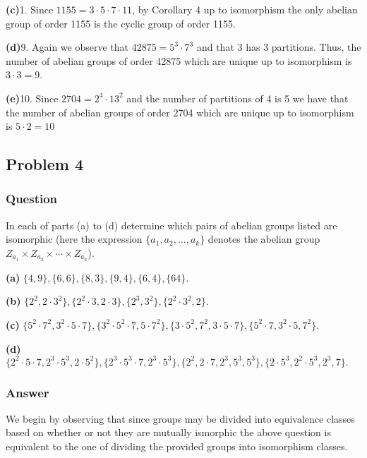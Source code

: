 \documentclass[12pt]{article}
\begin{document}
\textbf{(c)}1. Since $1155=3 \cdot 5 \cdot 7 \cdot 11$, by Corollary 4 up to isomorphism the only abelian group of order 1155 is the cyclic group of order 1155.


\textbf{(d)}9. Again we observe that $42875 = 5^3 \cdot 7^3$ and that 3 has 3 partitions. Thus, the number of abelian groups of order 42875 which are unique up to isomorphism is $3 \cdot 3 = 9$.


\textbf{(e)}10.  Since $2704 = 2^4 \cdot 13^2$ and the number of partitions of 4 is 5 we have that the number of abelian groups of order 2704 which are unique up to isomorphism is $5 \cdot 2 = 10$



\subsection{Problem 4}

\subsubsection{Question}

In each of parts (a) to (d) determine which pairs of abelian groups listed are isomorphic (here the expression $\{a_1, a_2, \dots, a_k\}$ denotes the abelian group $Z_{a_1} \times Z_{a_2} \times \cdots \times Z_{a_k}$).

\textbf{(a)} $\{4,9\}, \{6,6\}, \{8,3\}, \{9,4\}, \{6,4\}, \{64\}.$

\textbf{(b)} $\{2^2,2 \cdot 3^2\}, \{2^2 \cdot 3 , 2 \cdot 3\}, \{2^3,3^2\}, \{2^2 \cdot 3^2, 2\}.$


\textbf{(c)} $\{ 5^2 \cdot 7^2, 3^2 \cdot 5 \cdot 7 \}, \{ 3^2 \cdot 5^2 \cdot 7 , 5 \cdot 7^2 \}, \{ 3 \cdot 5^2, 7^2, 3 \cdot 5 \cdot 7 \}, \{ 5^2 \cdot 7 , 3^2 \cdot 5, 7^2 \}.$


\textbf{(d)} $\{ 2^2 \cdot 5 \cdot 7 , 2^3 \cdot 5^3, 2 \cdot 5^2 \}, \{ 2^3 \cdot 5^3 \cdot 7, 2^3 \cdot 5^3 \}, \{ 2^2 , 2 \cdot 7, 2^3, 5^3, 5^3 \}, \{ 2 \cdot 5^3, 2^2 \cdot 5^3, 2^3, 7\}.$



\subsubsection{Answer}
We begin by observing that since groups may be divided into equivalence classes based on whether or not they are mutually ismorphic the above question is equivalent to the one of dividing the provided groups into isomorphism classes.
\end{document}
